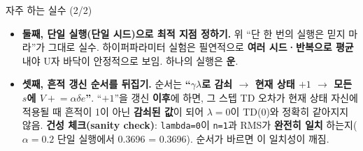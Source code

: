 \begin{frame}{자주 하는 실수 (2/2)}
  \begin{itemize}
    \item \textbf{둘째, 단일 실행(단일 시드)으로 최적 지점 정하기.}
      위 ``단 한 번의 실행은 믿지 마라''가 그대로 실수. 하이퍼파라미터
      실험은 필연적으로 \textbf{여러 시드·반복으로 평균}내야 U자 바닥이
      안정적으로 보임. 하나의 실행은 \textbf{운}.
    \item \textbf{셋째, 흔적 갱신 순서를 뒤집기.} 순서는
      \textbf{``$\gamma\lambda$로 감쇠 $\to$ 현재 상태 $+1$ $\to$
      모든 $s$에 $V \mathrel{+}= \alpha\delta e$''}.
      ``$+1$''을 갱신 \textbf{이후}에 하면, 그 스텝 TD 오차가 현재
      상태 자신에 적용될 때 흔적이 1이 아닌 \textbf{감쇠된 값}이 되어
      $\lambda=0$이 TD(0)와 정확히 같아지지 않음.
      \textbf{건성 체크(sanity check)}:
      \texttt{lambda=0}이 \texttt{n=1}과 RMS가 \textbf{완전히 일치}
      하는지($\alpha=0.2$ 단일 실행에서 0.3696 = 0.3696).
      순서가 바르면 이 일치성이 깨짐.
  \end{itemize}
\end{frame}
